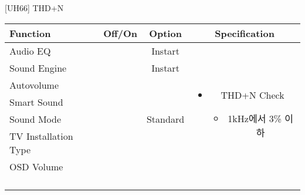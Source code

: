 \begin{frame}[t]{[UH66] THD+N}
\begin{tiny}
\begin{tabular}{@{}lccc@{}}
\toprule
Function & Off/On & Option & Specification \\
\midrule
Audio EQ & \color{black}{Off} & Instart &
\multirow{10}{60mm}{
\begin{itemize}
\item THD+N Check
	\begin{itemize}
	\item 1kHz에서 3\% 이하
	\end{itemize}
\end{itemize}
} \\
Sound Engine & \color{black}{Off} & Instart & \\
Autovolume & \color{black}{Off} & & \\
Smart Sound & \color{black}{Off} & & \\
Sound Mode & \color{blue}{On} & Standard & \\
TV Installation Type & \color{blue}{On} & \color{black}{Standtype1} & \\
OSD Volume & \color{blue}{On} & \color{blue}{Vol.100} & \\
& & & \\
& & & \\
& & & \\
& & & \\
\midrule
\end{tabular}
\end{tiny}

\end{frame}



